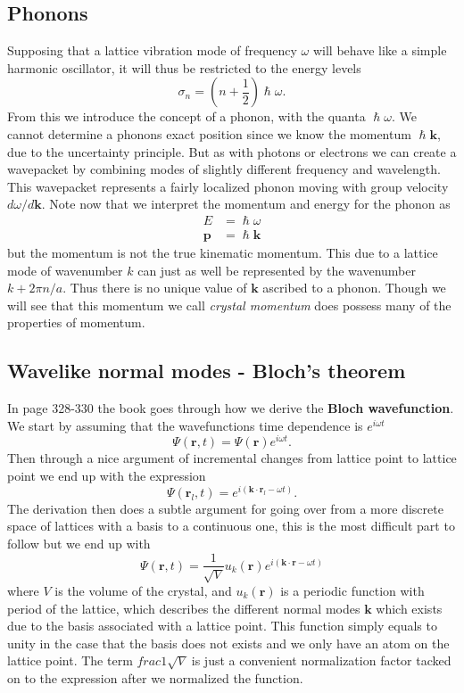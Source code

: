 \documentclass[11pt]{article}
\begin{document}
\subsection{Phonons}
Supposing that a lattice vibration mode of frequency $\omega$ will behave like a simple harmonic oscillator, it will thus be restricted to the energy levels
\begin{equation}
	\sigma_n = (n+\frac{1}{2}) \hslash \omega.
\end{equation}
From this we introduce the concept of a phonon, with the quanta $\hslash \omega$. We cannot determine a phonons exact position since we know the momentum $\hslash \pmb{k}$, due to the uncertainty principle. But as with photons or electrons we can create a wavepacket by combining modes of slightly different frequency and wavelength. This wavepacket represents a fairly localized phonon moving with group velocity $d\omega/d\pmb{k}$. Note now that we interpret the momentum and energy for the phonon as
\begin{align}
	E &= \hslash \omega \\
	\pmb{p} &= \hslash \pmb{k}
\end{align}
but the momentum is not the true kinematic momentum. This due to a lattice mode of wavenumber $k$ can just as well be represented by the wavenumber $k+2\pi n  /a$. Thus there is no unique value of $\pmb{k}$ ascribed to a phonon. Though we will see that this momentum we call \emph{crystal momentum} does possess many of the properties of momentum.

\subsection{Wavelike normal modes - Bloch's theorem}
In page 328-330 the book goes through how we derive the \textbf{Bloch wavefunction}. We start by assuming that the wavefunctions time dependence is $e^{i\omega t }$
\begin{equation}
	\Psi(\pmb{r},t) = \Psi(\pmb{r}) e^{i\omega t}.
\end{equation}
Then through a nice argument of incremental changes from lattice point to lattice point we end up with the expression
\begin{equation}
	\Psi(\pmb{r}_l,t) = e^{i(\pmb{k} \cdot \pmb{r}_l - \omega t)}.
\end{equation}
The derivation then does a subtle argument for going over from a more discrete space of lattices with a basis to a continuous one, this is the most difficult part to follow but we end up with
\begin{equation}
	\Psi(\pmb{r},t) = \frac{1}{\sqrt{V}} u_k(\pmb{r}) e^{i(\pmb{k} \cdot \pmb{r} - \omega t)}
	\label{eq:bloch-wavefunction}
\end{equation}
where $V$ is the volume of the crystal, and $u_k(\pmb{r})$ is a periodic function with period of the lattice, which describes the different normal modes $\pmb{k}$ which exists due to the basis associated with a lattice point. This function simply equals to unity in the case that the basis does not exists and we only have an atom on the lattice point. The term $frac{1}{\sqrt{V}}$ is just a convenient normalization factor tacked on to the expression after we normalized the function.
\end{document}
